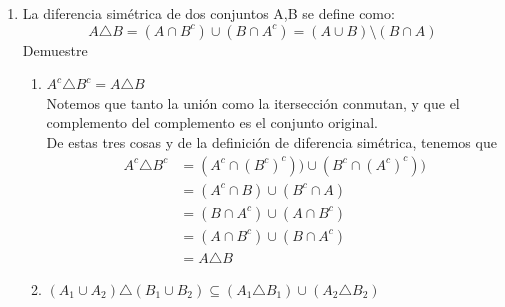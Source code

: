\documentclass[12pt,a4paper]{report}
\begin{document}
\begin{enumerate}
   \item {
  La diferencia simétrica de dos conjuntos A,B se define como:\\

		$$A\triangle B = (A \cap B^c) \cup (B \cap A^c)=(A \cup B) \setminus (B \cap A)$$
Demuestre
\begin{enumerate}[label=\alph*) ]
	\item{
		$A^c \triangle B^c = A \triangle B $ \\

		Notemos que tanto la unión como la itersección conmutan, y que el complemento
		del complemento es el conjunto original.\\
		De estas tres cosas y de la definición de diferencia simétrica, tenemos que
		\begin{align*}
			A^c \triangle B^c &= (A^c \cap (B^c)^c)) \cup (B^c \cap (A^c)^c))\\
												&= (A^c \cap B) \cup (B^c \cap A)\\
												&= (B \cap A^c) \cup (A \cap B^c)\\
												&= (A \cap B^c) \cup (B \cap A^c)\\
												&= A \triangle B
		\end{align*}
	}

	\item{
		$ (A_{1} \cup A_{2})\triangle (B_{1} \cup B_{2})\subseteq (A_{1} \triangle B_{1}) \cup (A_{2} \triangle B_{2}) $ \\

}
\end{enumerate}}
\end{enumerate}
\end{document}
